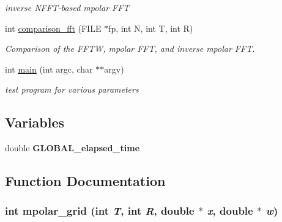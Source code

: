 \begin{CompactItemize}
\begin{CompactList}\small\item\em inverse NFFT-based mpolar FFT \item\end{CompactList}\item 
\hypertarget{group__applications__polarFFT__mpolar_ga5}{
int \hyperlink{group__applications__polarFFT__mpolar_ga5}{comparison\_\-fft} (FILE $\ast$fp, int N, int T, int R)}
\label{group__applications__polarFFT__mpolar_ga5}

\begin{CompactList}\small\item\em Comparison of the FFTW, mpolar FFT, and inverse mpolar FFT. \item\end{CompactList}\item 
\hypertarget{group__applications__polarFFT__mpolar_ga6}{
int \hyperlink{group__applications__polarFFT__mpolar_ga6}{main} (int argc, char $\ast$$\ast$argv)}
\label{group__applications__polarFFT__mpolar_ga6}

\begin{CompactList}\small\item\em test program for various parameters \item\end{CompactList}\end{CompactItemize}
\subsection*{Variables}
\begin{CompactItemize}
\item 
\hypertarget{group__applications__polarFFT__mpolar_ga0}{
double {\bf GLOBAL\_\-elapsed\_\-time}}
\label{group__applications__polarFFT__mpolar_ga0}

\end{CompactItemize}


\subsection{Function Documentation}
\hypertarget{group__applications__polarFFT__mpolar_ga1}{
\subsubsection[mpolar\_\-grid]{\setlength{\rightskip}{0pt plus 5cm}int mpolar\_\-grid (int {\em T}, int {\em R}, double $\ast$ {\em x}, double $\ast$ {\em w})}}
\label{group__applications__polarFFT__mpolar_ga1}


